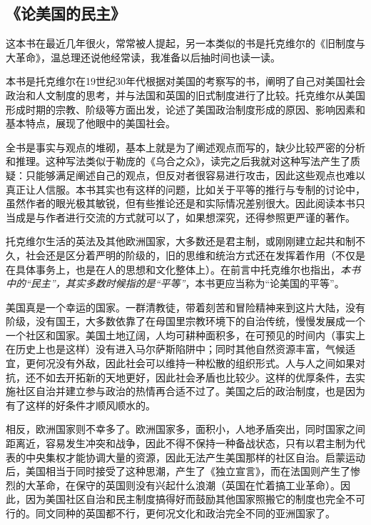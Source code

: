 \subsection{《论美国的民主》}

这本书在最近几年很火，常常被人提起，另一本类似的书是托克维尔的《旧制度与大革命》，温总理还说他经常读，我准备以后抽时间也读一读。

本书是托克维尔在19世纪30年代根据对美国的考察写的书，阐明了自己对美国社会政治和人文制度的思考，并与法国和英国的旧式制度进行了比较。托克维尔从美国形成时期的宗教、阶级等方面出发，论述了美国政治制度形成的原因、影响因素和基本特点，展现了他眼中的美国社会。

全书是事实与观点的堆砌，基本上就是为了阐述观点而写的，缺少比较严密的分析和推理。这种写法类似于勒庞的《乌合之众》，读完之后我就对这种写法产生了质疑：只能够满足阐述自己的观点，但反对者很容易进行攻击，因此这些观点也难以真正让人信服。本书其实也有这样的问题，比如关于平等的推行与专制的讨论中，虽然作者的眼光极其敏锐，但有些推论还是和实际情况差别很大。因此阅读本书只当成是与作者进行交流的方式就可以了，如果想深究，还得参照更严谨的著作。

托克维尔生活的英法及其他欧洲国家，大多数还是君主制，或刚刚建立起共和制不久，社会还是区分着严明的阶级的，旧的思维和统治方式还在发挥着作用（不仅是在具体事务上，也是在人的思想和文化整体上）。在前言中托克维尔也指出，\emph{本书中的“民主”，其实多数时候指的是“平等”}，本书更应当称为“论美国的平等”。

美国真是一个幸运的国家。一群清教徒，带着刻苦和冒险精神来到这片大陆，没有阶级，没有国王，大多数依靠了在母国里宗教环境下的自治传统，慢慢发展成一个一个社区和国家。美国土地辽阔，人均可耕种面积多，在可预见的时间内（事实上在历史上也是这样）没有进入马尔萨斯陷阱中；同时其他自然资源丰富，气候适宜，更何况没有外敌，因此社会可以维持一种松散的组织形式。人与人之间如果对抗，还不如去开拓新的天地更好，因此社会矛盾也比较少。这样的优厚条件，去实施社区自治并建立参与政治的热情再合适不过了。美国之后的政治制度，也是因为有了这样的好条件才顺风顺水的。

相反，欧洲国家则不幸多了。欧洲国家多，面积小，人地矛盾突出，同时国家之间距离近，容易发生冲突和战争，因此不得不保持一种备战状态，只有以君主制为代表的中央集权才能协调大量的资源，因此无法产生美国那样的社区自治。启蒙运动后，美国相当于同时接受了这种思潮，产生了《独立宣言》，而在法国则产生了惨烈的大革命，在保守的英国则没有兴起什么浪潮（英国在忙着搞工业革命）。因此，因为美国社区自治和民主制度搞得好而鼓励其他国家照搬它的制度也完全不可行的。同文同种的英国都不行，更何况文化和政治完全不同的亚洲国家了。

